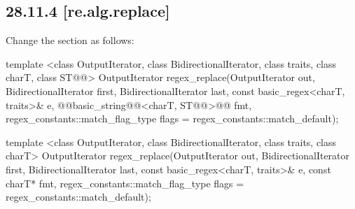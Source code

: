 \documentclass[ebook,11pt,article]{memoir}
\begin{document}
\subsection{28.11.4 [re.alg.replace]}
Change the section as follows:

\begin{itemdecl}
template <class OutputIterator, class BidirectionalIterator,
    class traits, class charT, class ST@@>
  OutputIterator 
  regex_replace(OutputIterator out,
                BidirectionalIterator first, BidirectionalIterator last,
                const basic_regex<charT, traits>& e,
                @@basic_string@@<charT, ST@@>@\del{\&}@ fmt,
                regex_constants::match_flag_type flags =
                  regex_constants::match_default);
\end{itemdecl}
\begin{removedblock}
\begin{itemdecl}
template <class OutputIterator, class BidirectionalIterator,
    class traits, class charT>
  OutputIterator
  regex_replace(OutputIterator out,
                BidirectionalIterator first, BidirectionalIterator last,
                const basic_regex<charT, traits>& e,
                const charT* fmt,
                regex_constants::match_flag_type flags =
                  regex_constants::match_default);
\end{itemdecl}
\end{removedblock}
\end{document}
